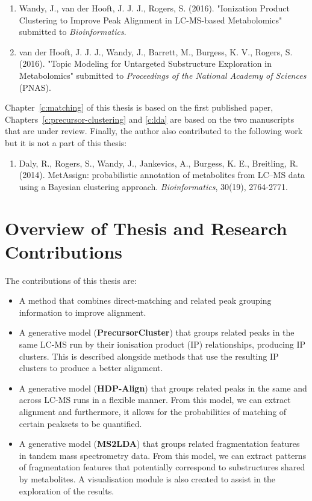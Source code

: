 \begin{enumerate}
\item Wandy, J., van der Hooft, J. J. J., Rogers, S. (2016). "Ionization Product Clustering to Improve Peak Alignment in LC-MS-based Metabolomics" submitted to \textit{Bioinformatics}.
\item van der Hooft, J. J. J., Wandy, J., Barrett, M., Burgess, K. V., Rogers, S. (2016). "Topic Modeling for Untargeted Substructure Exploration in Metabolomics" submitted to \textit{Proceedings of the National Academy of Sciences} (PNAS).
\end{enumerate}

Chapter~\ref{c:matching} of this thesis is based on the first published paper, Chapters~\ref{c:precursor-clustering} and \ref{c:lda} are based on the two manuscripts that are under review. Finally, the author also contributed to the following work but it is not a part of this thesis:

\begin{enumerate}
\item Daly, R., Rogers, S., Wandy, J., Jankevics, A., Burgess, K. E., Breitling, R. (2014). MetAssign: probabilistic annotation of metabolites from LC–MS data using a Bayesian clustering approach. \textit{Bioinformatics}, 30(19), 2764-2771.
\end{enumerate}

\section{Overview of Thesis and Research Contributions}

The contributions of this thesis are:

\begin{itemize}
\item A method that combines direct-matching and related peak grouping information to improve alignment.
\item A generative model (\textbf{PrecursorCluster}) that groups related peaks in the same LC-MS run by their ionisation product (IP) relationships, producing IP clusters. This is described alongside methods that use the resulting IP clusters to produce a better alignment.
\item A generative model (\textbf{HDP-Align}) that groups related peaks in the same and across LC-MS runs in a flexible manner. From this model, we can extract alignment and furthermore, it allows for the probabilities of matching of certain peaksets to be quantified.
\item A generative model (\textbf{MS2LDA}) that groups related fragmentation features in tandem mass spectrometry data. From this model, we can extract patterns of fragmentation features that potentially correspond to substructures shared by metabolites. A visualisation module is also created to assist in the exploration of the results.
\end{itemize}

